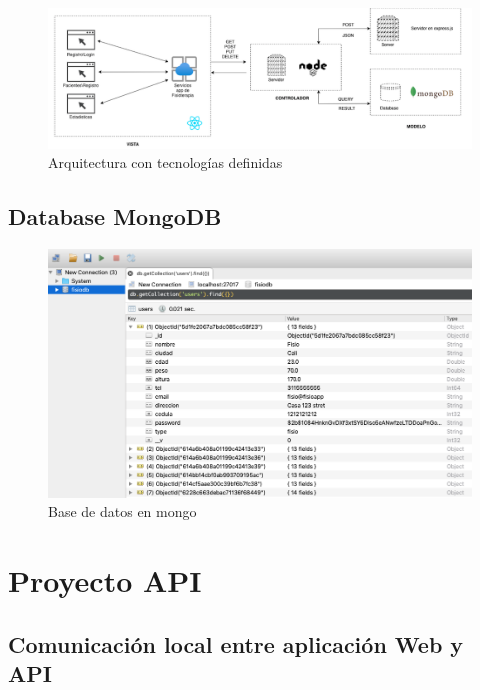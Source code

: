 \documentclass[12pt]{article}
\begin{document}
\begin{figure}[ht]
\centering
\includegraphics[scale=0.36]{imag/React1.png}
\caption{Arquitectura con tecnologías definidas }
\label{6}
\end{figure}
\FloatBarrier





\subsection{Database MongoDB}

\begin{figure}[ht]
\centering
\includegraphics[scale=0.36]{imag/databasemongo.png}
\caption{Base de datos en mongo }
\label{6}
\end{figure}
\FloatBarrier







\section{Proyecto API}


\subsection{Comunicación local entre aplicación Web y API}
\end{document}
